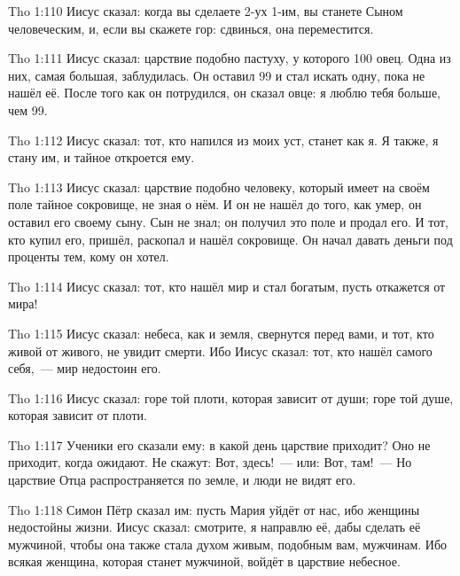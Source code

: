 \vs Tho 1:110
Иисус сказал:
когда вы сделаете 2-ух 1-им, вы станете Сыном человеческим,
и, если вы скажете гор: сдвинься, она переместится.

\vs Tho 1:111
Иисус сказал: царствие подобно пастуху, у которого 100 овец.
Одна из них, самая большая, заблудилась.
Он оставил 99 и стал искать одну, пока не нашёл её.
После того как он потрудился, он сказал овце:
я люблю тебя больше, чем 99.

\vs Tho 1:112
Иисус сказал:
тот, кто напился из моих уст, станет как я.
Я также, я стану им, и тайное откроется ему.

\vs Tho 1:113
Иисус сказал:
царствие подобно человеку,
который имеет на своём поле тайное сокровище,
не зная о нём.
И он не нашёл до того, как умер, он оставил его своему сыну.
Сын не знал; он получил это поле и продал его.
И тот, кто купил его, пришёл, раскопал и нашёл сокровище.
Он начал давать деньги под проценты тем, кому он хотел.

\vs Tho 1:114
Иисус сказал:
тот, кто нашёл мир и стал богатым, пусть откажется от мира!

\vs Tho 1:115
Иисус сказал:
небеса, как и земля, свернутся перед вами,
и тот, кто живой от живого, не увидит смерти.
Ибо Иисус сказал: тот, кто нашёл самого себя,~--- мир недостоин его.

\vs Tho 1:116
Иисус сказал:
горе той плоти, которая зависит от души;
горе той душе, которая зависит от плоти.

\vs Tho 1:117
Ученики его сказали ему:
в какой день царствие приходит?
Оно не приходит, когда ожидают.
Не скажут: Вот, здесь!~--- или:
Вот, там!~--- Но царствие Отца распространяется по земле,
и люди не видят его.

\vs Tho 1:118
Симон Пётр сказал им:
пусть Мария уйдёт от нас, ибо женщины недостойны жизни.
Иисус сказал:
смотрите, я направлю её, дабы сделать её мужчиной,
чтобы она также стала духом живым, подобным вам, мужчинам.
Ибо всякая женщина, которая станет мужчиной, войдёт в царствие небесное.
